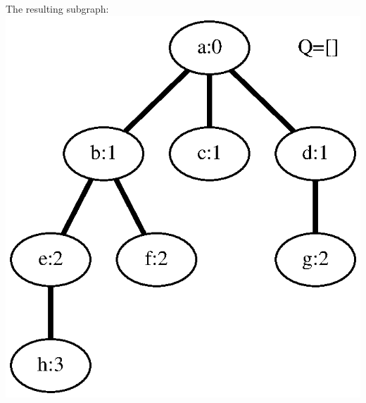 \documentclass{article}
\begin{document}
\HR
\begin{minipage}[b][.25\textheight]{0.303030303030303\linewidth}
The resulting subgraph: 
\includegraphics[height=.25\textheight]{bfs_undirected_classroom_key_09.eps}
\end{minipage}
\end{document}
